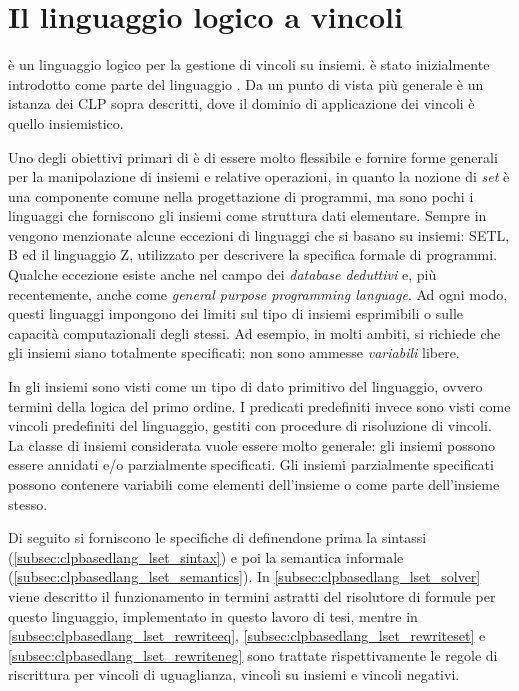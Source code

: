 \documentclass[12pt,a4paper,openright]{book} %
\begin{document}
\section{Il linguaggio logico a vincoli \lset{}}
\label{sec:clpbasedlang_lset}

\lset{} è un linguaggio logico per la gestione di vincoli su
insiemi. \lset{} è stato inizialmente introdotto come parte del
linguaggio \clpset{} \cite{Dovier00}. Da un punto di vista più
generale \clpset{} è un istanza dei CLP sopra descritti, dove il
dominio di applicazione dei vincoli è quello insiemistico.

Uno degli obiettivi primari di \clpset{} è di essere molto flessibile
e fornire forme generali per la manipolazione di insiemi e relative
operazioni, in quanto la nozione di \emph{set} è una componente comune
nella progettazione di programmi, ma sono pochi i linguaggi che
forniscono gli insiemi come struttura dati elementare.  Sempre in
\cite{Dovier00} vengono menzionate alcune eccezioni di linguaggi che
si basano su insiemi: SETL, B ed il linguaggio Z, utilizzato per
descrivere la specifica formale di programmi. Qualche eccezione esiste
anche nel campo dei \emph{database deduttivi} e, più recentemente,
anche come \emph{general purpose programming language}. Ad ogni modo,
questi linguaggi impongono dei limiti sul tipo di insiemi esprimibili
o sulle capacità computazionali degli stessi. Ad esempio, in molti
ambiti, si richiede che gli insiemi siano totalmente specificati: non
sono ammesse \emph{variabili} libere.

In \lset{} gli insiemi sono visti come un tipo di dato primitivo del
linguaggio, ovvero termini della logica del primo ordine. I predicati
predefiniti invece sono visti come vincoli predefiniti del linguaggio,
gestiti con procedure di risoluzione di vincoli. La classe di insiemi
considerata vuole essere molto generale: gli insiemi possono essere
annidati e/o parzialmente specificati. Gli insiemi parzialmente
specificati possono contenere variabili come elementi dell’insieme o
come parte dell’insieme stesso.

Di seguito si forniscono le specifiche di \lset{} definendone prima la
sintassi (\ref{subsec:clpbasedlang_lset_sintax}) e poi la semantica
informale (\ref{subsec:clpbasedlang_lset_semantics}). In
\ref{subsec:clpbasedlang_lset_solver} viene descritto il funzionamento
in termini astratti del risolutore di formule per questo linguaggio,
implementato in questo lavoro di tesi, mentre in
\ref{subsec:clpbasedlang_lset_rewriteeq},
\ref{subsec:clpbasedlang_lset_rewriteset} e
\ref{subsec:clpbasedlang_lset_rewriteneg} sono trattate
rispettivamente le regole di riscrittura per vincoli di uguaglianza,
vincoli su insiemi e vincoli negativi.
\end{document}
